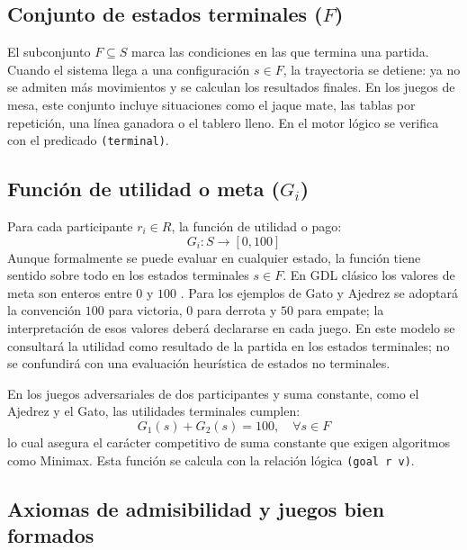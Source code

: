 \subsection{Conjunto de estados terminales (\texorpdfstring{$F$}{F})}

El subconjunto $F \subseteq S$ marca las condiciones en las que termina una partida. Cuando el sistema llega a una configuración $s \in F$, la trayectoria se detiene: ya no se admiten más movimientos y se calculan los resultados finales. En los juegos de mesa, este conjunto incluye situaciones como el jaque mate, las tablas por repetición, una línea ganadora o el tablero lleno. En el motor lógico se verifica con el predicado \texttt{(terminal)}.

\subsection{Función de utilidad o meta (\texorpdfstring{$G_i$}{Gi})}

Para cada participante $r_i \in R$, la función de utilidad o pago:
\begin{equation}
    G_i : S \to [0, 100]
    \label{eq:funcion-utilidad}
\end{equation}
Aunque formalmente se puede evaluar en cualquier estado, la función tiene sentido sobre todo en los estados terminales $s \in F$. En GDL clásico los valores de meta son enteros entre $0$ y $100$ \cite{Love2008GDL}. Para los ejemplos de Gato y Ajedrez se adoptará la convención $100$ para victoria, $0$ para derrota y $50$ para empate; la interpretación de esos valores deberá declararse en cada juego. En este modelo se consultará la utilidad como resultado de la partida en los estados terminales; no se confundirá con una evaluación heurística de estados no terminales.

En los juegos adversariales de dos participantes y suma constante, como el Ajedrez y el Gato, las utilidades terminales cumplen:
\begin{equation}
    G_1(s) + G_2(s) = 100, \quad \forall s \in F
    \label{eq:suma-constante}
\end{equation}
lo cual asegura el carácter competitivo de suma constante que exigen algoritmos como Minimax. Esta función se calcula con la relación lógica \texttt{(goal r v)}.

\subsection{Axiomas de admisibilidad y juegos bien formados}

